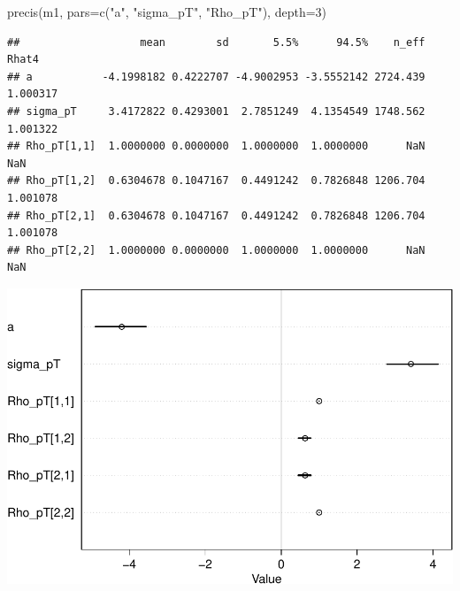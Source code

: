 \documentclass[
]{article}
\newenvironment{Shaded}{\begin{snugshade}}{\end{snugshade}}
\newcommand{\AttributeTok}[1]{\textcolor[rgb]{0.77,0.63,0.00}{#1}}
\newcommand{\DecValTok}[1]{\textcolor[rgb]{0.00,0.00,0.81}{#1}}
\newcommand{\FunctionTok}[1]{\textcolor[rgb]{0.00,0.00,0.00}{#1}}
\newcommand{\NormalTok}[1]{#1}
\newcommand{\OtherTok}[1]{\textcolor[rgb]{0.56,0.35,0.01}{#1}}
\newcommand{\SpecialCharTok}[1]{\textcolor[rgb]{0.00,0.00,0.00}{#1}}
\newcommand{\StringTok}[1]{\textcolor[rgb]{0.31,0.60,0.02}{#1}}
\begin{document}
\begin{Shaded}
\begin{Highlighting}[]
\FunctionTok{precis}\NormalTok{(m1, }\AttributeTok{pars=}\FunctionTok{c}\NormalTok{(}\StringTok{"a"}\NormalTok{, }\StringTok{"sigma\_pT"}\NormalTok{, }\StringTok{"Rho\_pT"}\NormalTok{), }\AttributeTok{depth=}\DecValTok{3}\NormalTok{)}
\end{Highlighting}
\end{Shaded}

\begin{verbatim}
##                   mean        sd       5.5%      94.5%    n_eff    Rhat4
## a           -4.1998182 0.4222707 -4.9002953 -3.5552142 2724.439 1.000317
## sigma_pT     3.4172822 0.4293001  2.7851249  4.1354549 1748.562 1.001322
## Rho_pT[1,1]  1.0000000 0.0000000  1.0000000  1.0000000      NaN      NaN
## Rho_pT[1,2]  0.6304678 0.1047167  0.4491242  0.7826848 1206.704 1.001078
## Rho_pT[2,1]  0.6304678 0.1047167  0.4491242  0.7826848 1206.704 1.001078
## Rho_pT[2,2]  1.0000000 0.0000000  1.0000000  1.0000000      NaN      NaN
\end{verbatim}

\begin{center}\includegraphics{Geraldes-week08_files/figure-latex/unnamed-chunk-5-1} \end{center}

\begin{Shaded}
\end{Shaded}
\end{document}
